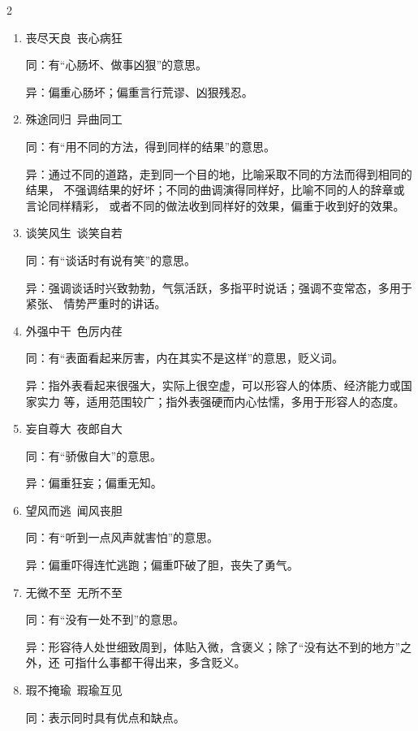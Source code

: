 \documentclass[final,oneside]{ctexbook}
\begin{document}
\begin{multicols}{2}
\begin{enumerate}
      异：侧重对情况熟悉；侧重行动上运用自如。

    \item 丧尽天良~丧心病狂

      同：有“心肠坏、做事凶狠”的意思。

      异：偏重心肠坏；偏重言行荒谬、凶狠残忍。

    \item 殊途同归~异曲同工

      同：有“用不同的方法，得到同样的结果”的意思。

      异：通过不同的道路，走到同一个目的地，比喻采取不同的方法而得到相同的结果，
      不强调结果的好坏；不同的曲调演得同样好，比喻不同的人的辞章或言论同样精彩，
      或者不同的做法收到同样好的效果，偏重于收到好的效果。

    \item 谈笑风生~谈笑自若

      同：有“谈话时有说有笑”的意思。

      异：强调谈话时兴致勃勃，气氛活跃，多指平时说话；强调不变常态，多用于紧张、
      情势严重时的讲话。

    \item 外强中干~色厉内荏

      同：有“表面看起来厉害，内在其实不是这样”的意思，贬义词。

      异：指外表看起来很强大，实际上很空虚，可以形容人的体质、经济能力或国家实力
      等，适用范围较广；指外表强硬而内心怯懦，多用于形容人的态度。

    \item 妄自尊大~夜郎自大

      同：有“骄傲自大”的意思。

      异：偏重狂妄；偏重无知。

    \item 望风而逃~闻风丧胆

      同：有“听到一点风声就害怕”的意思。

      异：偏重吓得连忙逃跑；偏重吓破了胆，丧失了勇气。

    \item 无微不至~无所不至

      同：有“没有一处不到”的意思。

      异：形容待人处世细致周到，体贴入微，含褒义；除了“没有达不到的地方”之外，还
      可指什么事都干得出来，多含贬义。

    \item 瑕不掩瑜~瑕瑜互见

      同：表示同时具有优点和缺点。


\end{enumerate}
\end{multicols}
\end{document}
